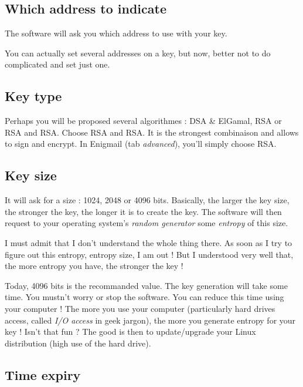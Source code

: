 \subsection{Which address to indicate}\label{which-address-to-indicate}

The software will ask you which address to use with your key.

You can actually set several addresses on a key, but now, better not to do complicated and set just one.

\subsection{Key type}\label{key-type}

Perhaps you will be proposed several algorithmes : DSA \& ElGamal, RSA or RSA and RSA. Choose RSA and RSA. It is the strongest combinaison and allows to sign and encrypt. In Enigmail (tab \emph{advanced}), you'll simply choose RSA.

\subsection{Key size}\label{key-size}

It will ask for a size : 1024, 2048 or 4096 bits. Basically, the larger the key size, the stronger the key, the longer it is to create the key.
The software will then request to your operating system's \emph{random generator} some \emph{entropy} of this size.

\begin{notice}
I must admit that I don't understand the whole thing there. As soon as I
try to figure out this entropy, entropy size, I am out ! But I
understood very well that, the more entropy you have, the stronger the
key !
\end{notice}

Today, 4096 bits is the recommanded value. The key generation will take some time. You mustn't worry or stop the
software. You can reduce this time using your computer ! The more you use your computer (particularly hard drives access, called \emph{I/O access} in
geek jargon), the more you generate entropy for your key ! Isn't that fun ? The good is then to update/upgrade your Linux distribution (high
use of the hard drive).

\subsection{Time expiry}\label{time-expiry}

